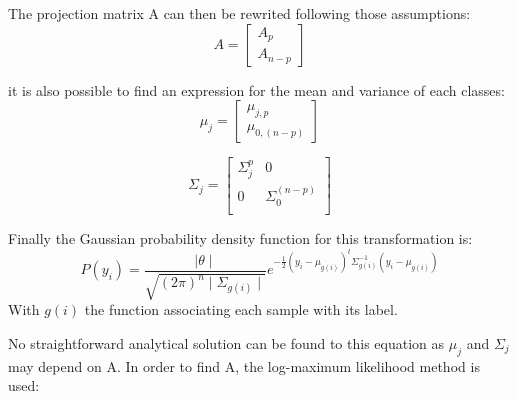 The projection matrix A can then be rewrited following those assumptions:
$$A = \left [
  \begin{array}{c}
    A_p\\
    A_{n-p}
  \end{array}
\right ]
$$

it is also possible to find an expression for the mean and variance of each classes:
$$\mu_j =
\left [
  \begin{array}{c}
    \mu_{j,p}\\
    \mu_{0,(n-p)}
  \end{array}
\right ]
$$

$$\Sigma_j =
\left [
  \begin{array}{cc}
    \Sigma_j^p & 0\\
    0 & \Sigma_0^{(n-p)}\\
  \end{array}
\right ]
$$

Finally the Gaussian probability density function for this transformation is:
$$P(y_i) = \frac{\mid \theta \mid}{\sqrt{(2\pi)^n \mid \Sigma_{g(i)} \mid}}
    e^{-\frac{1}{2} (y_i - \mu_{g(i)})^t \Sigma_{g(i)}^{-1} (y_i - \mu_{g(i)})}$$
With $g(i)$ the function associating each sample with its label.

No straightforward analytical solution can be found to this equation as $\mu_j$ and $\Sigma_j$ may depend on A. In order to find A, the log-maximum likelihood method is used:

